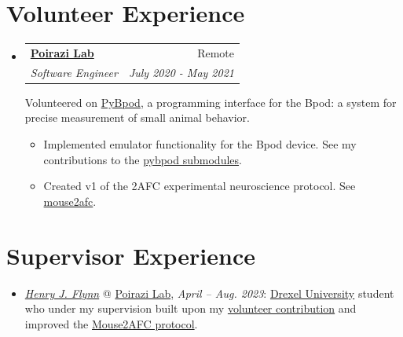 \documentclass[letterpaper,11pt]{article}
\makeatletter
\newcommand{\resumeSubheading}[4]{
  \vspace{-1pt}\item
    \begin{tabular*}{0.97\textwidth}[t]{l@{\extracolsep{\fill}}r}
      \textbf{#1} & #2 \\
      \textit{\small#3} & \textit{\small #4} \\
    \end{tabular*}\vspace{-5pt}
}
\newcommand{\resumeSubHeadingListStart}{\begin{itemize}[leftmargin=*]}
\newcommand{\resumeSubHeadingListEnd}{\end{itemize}}
\makeatother
\begin{document}
\section{Volunteer Experience}
  \resumeSubHeadingListStart
    \label{PoiraziLabVolMarker}
    \resumeSubheading
      {\hyperref[PoiraziLabMarker]{Poirazi Lab}}{Remote}
      {Software Engineer}{July 2020 - May 2021}
      \newline Volunteered on \href{https://pybpod.github.io/}{ PyBpod}, a programming interface for the Bpod: a system for precise measurement of small animal behavior.
      \begin{itemize}
        \setlength\itemsep{-0.3em}
        \item Implemented emulator functionality for the Bpod device. See my contributions to the \href{https://github.com/ckaraneen/pybpod}{pybpod submodules}.
        \item Created v1 of the 2AFC experimental neuroscience protocol. See \href{https://github.com/ckaraneen/mouse2afc}{mouse2afc}.
      \end{itemize}
    \resumeSubHeadingListEnd

\section{Supervisor Experience}
  \begin{itemize}
    \item \textit{\href{https://www.linkedin.com/in/henry-flynn/}{Henry J. Flynn}} @ \hyperref[PoiraziLabMarker]{Poirazi Lab}, \textit{April -- Aug. 2023}: \href{https://drexel.edu/}{{} Drexel University} student who under my supervision built upon my \hyperref[PoiraziLabVolMarker]{volunteer contribution} and improved the \href{https://github.com/Poirazi-Lab/mouse2afc}{Mouse2AFC protocol}.
  \end{itemize}

\end{document}
